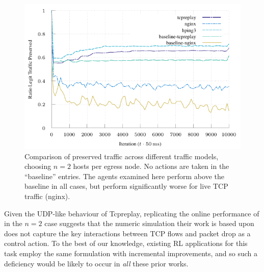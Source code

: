 \documentclass[conference, a4paper, 10pt, times]{IEEEtran}
\begin{document}

\begin{figure}
	\centering
	\includegraphics[width=0.95\linewidth]{../plots/online-varyN-nginx}
	\caption{
		Comparison of preserved traffic across different traffic models, choosing $n=2$ hosts per egress node.
		No actions are taken in the ``baseline'' entries.
		The agents examined here perform above the baseline in all cases, but perform significantly worse for live TCP traffic (nginx).
		\label{fig:nginx-coffin-nail}
	}
\end{figure}

Given the UDP-like behaviour of Tcpreplay, replicating the online performance of \citeauthor{DBLP:journals/eaai/MalialisK15} in the $n=2$ case suggests that the numeric simulation their work is based upon does not capture the key interactions between TCP flows and packet drop as a control action.
To the best of our knowledge, existing RL applications for this task employ the same formulation with incremental improvements, and so such a deficiency would be likely to occur in \emph{all} these prior works.
\end{document}
